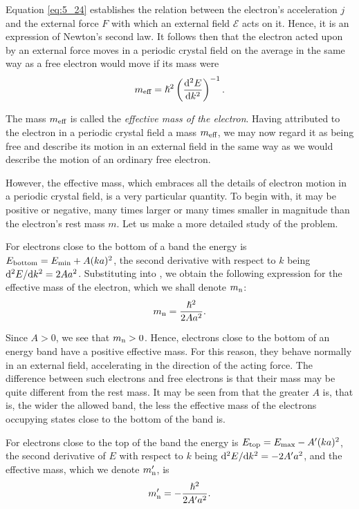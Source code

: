 Equation \eqref{eq:5_24} establishes the relation between the electron's acceleration $j$ and the external force $F$ with which an external field $\pmb{\mathscr{E}}$ acts on it. Hence, it is an expression of Newton's second law. It follows then that the electron acted upon by an external force moves in a periodic crystal field on the average in the same way as a free electron would move if its mass were
\begin{equation}\label{eq:5_25}
    m_{\text{eff}} = \hslash^2 \left(\dfrac{\mathrm{d}^{2}E}{\mathrm{d} k^{2}}\right)^{-1}.
\end{equation}

\noindent
The mass $m_{\text{eff}}$ is called the \textit{effective mass of the electron}. Having attributed to the electron in a periodic crystal field a mass $m_{\text{eff}}$, we may now regard it as being free and describe its motion in an external field in the same way as we would describe the motion of an ordinary free electron.

However, the effective mass, which embraces all the details of electron motion in a periodic crystal field, is a very particular quantity. To begin with, it may be positive or negative, many times larger or many times smaller in magnitude than the electron's rest mass $m$. Let us make a more detailed study of the problem.

For electrons close to the bottom of a band the energy is $E_{\text{bottom}}=E_{\text{min}}+A(ka)^2$, the second derivative with respect to $k$ being $\mathrm{d}^{2}E/\mathrm{d} k^{2}=2Aa^2$. Substituting into , we obtain the following expression for the effective mass of the electron, which we shall denote
$m_{\text{n}}$:
\begin{equation}\label{eq:5_26}
    m_{\text{n}} = \frac{\hslash^2}{2 A a^2}.
\end{equation}

\noindent
Since $A>0$, we see that $m_{\text{n}}>0$. Hence, electrons close to the bottom of an energy band have a positive effective mass. For this reason, they behave normally in an external field, accelerating in the direction of the acting force. The difference between such electrons and free electrons is that their mass may be quite different from the rest mass. It may be seen from  that the greater $A$ is, that is, the wider the allowed band, the less the effective mass of the electrons occupying states close to the bottom of the band is.

For electrons close to the top of the band the energy is $E_{\text{top}}=E_{\text{max}}-A'(ka)^2$, the second derivative of $E$ with respect to $k$ being $\mathrm{d}^{2}E/\mathrm{d} k^{2}=-2A'a^2$, and the effective mass, which we denote $m_{\text{n}}'$, is
\begin{equation}\label{eq:5_27}
    m_{\text{n}}' = - \frac{\hslash^2}{2 A' a^2}.
\end{equation}

